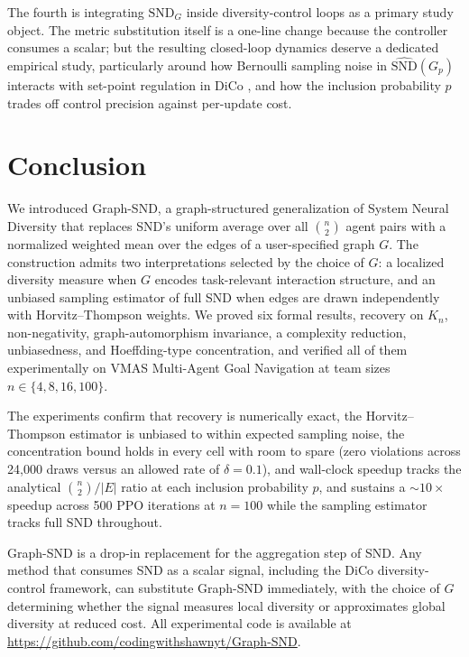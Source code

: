 \documentclass[11pt]{article}
\theoremstyle{plain}
\theoremstyle{definition}
\theoremstyle{remark}
\newcommand{\SND}{\ensuremath{\mathrm{SND}}}
\newcommand{\SNDG}{\mathrm{SND}_{G}}
\begin{document}
The fourth is integrating $\SNDG$ inside diversity-control loops as a
primary study object. The metric substitution itself is a one-line
change because the controller consumes a scalar; but the resulting
closed-loop dynamics deserve a dedicated empirical study, particularly
around how Bernoulli sampling noise in $\widehat{\SND}(G_p)$
interacts with set-point regulation in DiCo \citep{bettini2024dico},
and how the inclusion probability $p$ trades off control precision
against per-update cost.
\section{Conclusion}
\label{sec:conclusion}

We introduced Graph-SND, a graph-structured generalization of System
Neural Diversity that replaces SND's uniform average over all
$\binom{n}{2}$ agent pairs with a normalized weighted mean over the
edges of a user-specified graph $G$. The construction admits two
interpretations selected by the choice of $G$: a localized diversity
measure when $G$ encodes task-relevant interaction structure, and an
unbiased sampling estimator of full SND when edges are drawn
independently with Horvitz--Thompson weights. We proved six formal
results, recovery on $K_n$, non-negativity, graph-automorphism
invariance, a complexity reduction, unbiasedness, and Hoeffding-type
concentration, and verified all of them experimentally on VMAS Multi-Agent Goal Navigation at team sizes $n \in \{4, 8, 16, 100\}$.

The experiments confirm that recovery is numerically exact, the
Horvitz--Thompson estimator is unbiased to within expected sampling
noise, the concentration bound holds in every cell with room to spare
(zero violations across 24{,}000 draws versus an allowed rate of
$\delta = 0.1$), and wall-clock speedup tracks the analytical $\binom{n}{2}/|E|$ ratio at each inclusion probability $p$, and sustains a ${\sim}10\times$ speedup across 500 PPO iterations at $n=100$ while the sampling estimator tracks full \SND{} throughout.

Graph-SND is a drop-in replacement for the aggregation step of SND.
Any method that consumes SND as a scalar signal, including the DiCo
diversity-control framework, can substitute Graph-SND immediately,
with the choice of $G$ determining whether the signal measures local
diversity or approximates global diversity at reduced cost. All
experimental code is available at \url{https://github.com/codingwithshawnyt/Graph-SND}.
\end{document}
